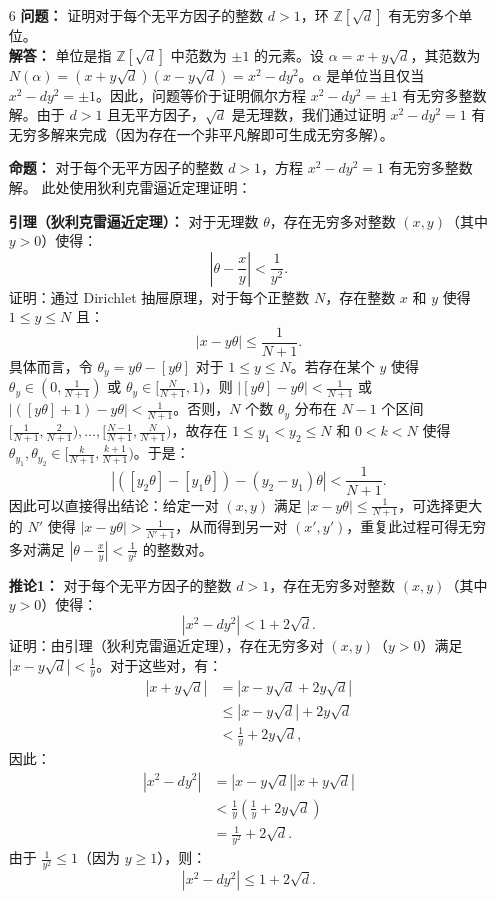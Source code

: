 \documentclass[UTF8]{ctexart}
\begin{document}
\begin{enumerate}
\item[6] 
\textbf{问题：} 证明对于每个无平方因子的整数 \(d > 1\)，环 \(\mathbb{Z}[\sqrt{d}]\) 有无穷多个单位。\\
\textbf{解答：} 单位是指 \(\mathbb{Z}[\sqrt{d}]\) 中范数为 \(\pm 1\) 的元素。设 \(\alpha = x + y \sqrt{d}\)，其范数为 \(N(\alpha) = (x + y \sqrt{d})(x - y \sqrt{d}) = x^2 - d y^2\)。\(\alpha\) 是单位当且仅当 \(x^2 - d y^2 = \pm 1\)。因此，问题等价于证明佩尔方程 \(x^2 - d y^2 = \pm 1\) 有无穷多整数解。由于 \(d > 1\) 且无平方因子，\(\sqrt{d}\) 是无理数，我们通过证明 \(x^2 - d y^2 = 1\) 有无穷多解来完成（因为存在一个非平凡解即可生成无穷多解）。  

\textbf{命题：} 对于每个无平方因子的整数 \(d > 1\)，方程 \(x^2 - d y^2 = 1\) 有无穷多整数解。  
此处使用狄利克雷逼近定理证明：  

\textbf{引理（狄利克雷逼近定理）：} 对于无理数 \(\theta\)，存在无穷多对整数 \((x, y)\)（其中 \(y > 0\)）使得：
\[
\left| \theta - \frac{x}{y} \right| < \frac{1}{y^2}.
\]
证明：通过 Dirichlet 抽屉原理，对于每个正整数 \(N\)，存在整数 \(x\) 和 \(y\) 使得 \(1 \leq y \leq N\) 且：
\[
|x - y \theta| \leq \frac{1}{N+1}.
\]
具体而言，令 \(\theta_y = y \theta - [y \theta]\) 对于 \(1 \leq y \leq N\)。若存在某个 \(y\) 使得 \(\theta_y \in (0, \frac{1}{N+1})\) 或 \(\theta_y \in [\frac{N}{N+1}, 1)\)，则 \(|[y \theta] - y \theta| < \frac{1}{N+1}\) 或 \(|([y \theta] + 1) - y \theta| < \frac{1}{N+1}\)。否则，\(N\) 个数 \(\theta_y\) 分布在 \(N-1\) 个区间 \([\frac{1}{N+1}, \frac{2}{N+1}), \dots, [\frac{N-1}{N+1}, \frac{N}{N+1})\)，故存在 \(1 \leq y_1 < y_2 \leq N\) 和 \(0 < k < N\) 使得 \(\theta_{y_1}, \theta_{y_2} \in [\frac{k}{N+1}, \frac{k+1}{N+1})\)。于是：
\[
\left| ([y_2 \theta] - [y_1 \theta]) - (y_2 - y_1) \theta \right| < \frac{1}{N+1}.
\]
因此可以直接得出结论：给定一对 \((x, y)\) 满足 \(|x - y \theta| \leq \frac{1}{N+1}\)，可选择更大的 \(N'\) 使得 \(|x - y \theta| > \frac{1}{N'+1}\)，从而得到另一对 \((x', y')\)，重复此过程可得无穷多对满足 \(\left| \theta - \frac{x}{y} \right| < \frac{1}{y^2}\) 的整数对。

\textbf{推论1：} 对于每个无平方因子的整数 \(d > 1\)，存在无穷多对整数 \((x, y)\)（其中 \(y > 0\)）使得：
\[
\left| x^2 - d y^2 \right| < 1 + 2\sqrt{d}.
\]
证明：由引理（狄利克雷逼近定理），存在无穷多对 \((x, y)\)（\(y > 0\)）满足 \(|x - y \sqrt{d}| < \frac{1}{y}\)。对于这些对，有：
\[
\begin{aligned}
|x + y \sqrt{d}| &= |x - y \sqrt{d} + 2 y \sqrt{d}| \\
&\leq |x - y \sqrt{d}| + 2 y \sqrt{d} \\
&< \frac{1}{y} + 2 y \sqrt{d},
\end{aligned}
\]
因此：
\[
\begin{aligned}
\left| x^2 - d y^2 \right| &= |x - y \sqrt{d}| |x + y \sqrt{d}| \\
&< \frac{1}{y} \left( \frac{1}{y} + 2 y \sqrt{d} \right) \\
&= \frac{1}{y^2} + 2 \sqrt{d}.
\end{aligned}
\]
由于 \(\frac{1}{y^2} \leq 1\)（因为 \(y \geq 1\)），则：
\[
\left| x^2 - d y^2 \right| \leq 1 + 2 \sqrt{d}.
\]


\end{enumerate}
\end{document}
